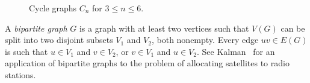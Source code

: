 \begin{figure}[!htbp]
\centering
{}
\quad
{}
\quad
{}
\quad
{}
\caption{Cycle graphs $C_n$ for $3 \leq n \leq 6$.}
\label{fig:introduction:four_cycle_graphs}
\end{figure}

A \emph{bipartite graph} $G$ is a graph with at
least two vertices such that $V(G)$ can be split into two disjoint
subsets $V_1$ and $V_2$, both nonempty. Every edge $uv \in E(G)$ is
such that $u \in V_1$ and $v \in V_2$, or $v \in V_1$ and $u \in V_2$.
See Kalman~\cite{Kalman1999} for an application of bipartite graphs to
the problem of allocating satellites to radio stations.

